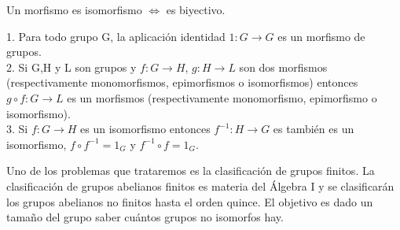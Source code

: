 \begin{nprop}
Un morfismo es isomorfismo $\iff$ es biyectivo.
\end{nprop}

\begin{nprop}
1. Para todo grupo G, la aplicación identidad $1:G \rightarrow G$ es un morfismo de grupos. \\
2. Si G,H y L son grupos y $f:G \rightarrow H$, $g:H \rightarrow L$ son dos morfismos (respectivamente monomorfismos, epimorfismos o isomorfismos) entonces $g \circ f:G \rightarrow L$ es un morfismos (respectivamente monomorfismo, epimorfismo o isomorfismo). \\
3. Si $f:G \rightarrow H$ es un isomorfismo entonces $f^{-1}:H \rightarrow G$ es también es un isomorfismo, $f \circ f^{-1} = 1_G$ y  $f^{-1} \circ f = 1_G$.
\end{nprop}

Uno de los problemas que trataremos es la clasificación de grupos finitos. La clasificación de grupos abelianos finitos es materia del Álgebra I y se clasificarán los grupos abelianos no finitos hasta el orden quince. El objetivo es dado un tamaño del grupo saber cuántos grupos no isomorfos hay.
